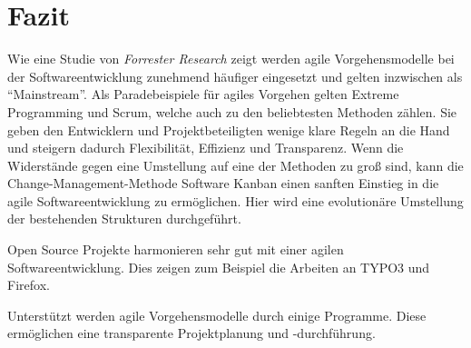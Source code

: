 \section{Fazit}
Wie eine Studie von \emph{Forrester Research} zeigt werden agile Vorgehensmodelle bei der Softwareentwicklung zunehmend häufiger eingesetzt und gelten inzwischen als ``Mainstream''. \cite{bib:ane} Als Paradebeispiele für agiles Vorgehen gelten Extreme Programming und Scrum, welche auch zu den beliebtesten Methoden zählen. Sie geben den Entwicklern und Projektbeteiligten wenige klare Regeln an die Hand und steigern dadurch Flexibilität, Effizienz und Transparenz. \cite[S. 28 f.]{bib:wolfRoock} Wenn die Widerstände gegen eine Umstellung auf eine der Methoden zu groß sind, kann die Change-Management-Methode Software Kanban einen sanften Einstieg in die agile Softwareentwicklung zu ermöglichen. Hier wird eine evolutionäre Umstellung der bestehenden Strukturen durchgeführt.

Open Source Projekte harmonieren sehr gut mit einer agilen Softwareentwicklung. Dies zeigen zum Beispiel die Arbeiten an TYPO3 und Firefox. 

Unterstützt werden agile Vorgehensmodelle durch einige Programme. Diese ermöglichen eine transparente Projektplanung und -durchführung. 